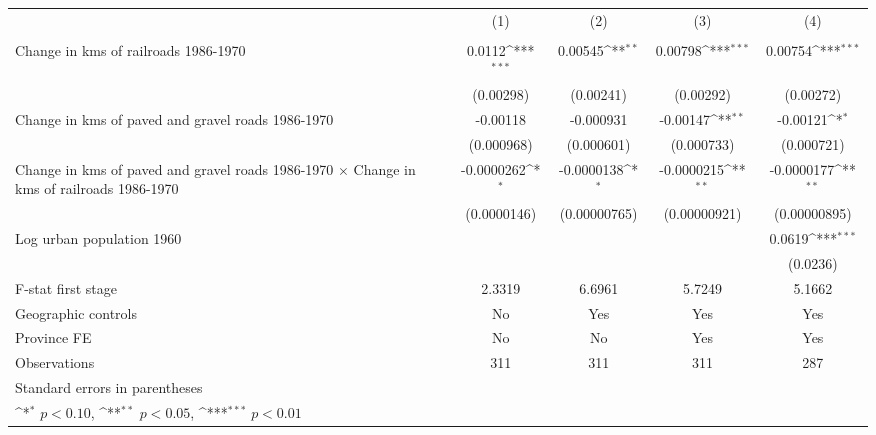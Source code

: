 {
\def\sym#1{\ifmmode^{#1}\else\(^{#1}\)\fi}
\begin{tabular}{l*{4}{c}}
\hline\hline
                &\multicolumn{1}{c}{(1)}&\multicolumn{1}{c}{(2)}&\multicolumn{1}{c}{(3)}&\multicolumn{1}{c}{(4)}\\
                &\multicolumn{1}{c}{}&\multicolumn{1}{c}{}&\multicolumn{1}{c}{}&\multicolumn{1}{c}{}\\
\hline
Change in kms of railroads 1986-1970&   0.0112\sym{***}&  0.00545\sym{**} &  0.00798\sym{***}&  0.00754\sym{***}\\
                &(0.00298)         &(0.00241)         &(0.00292)         &(0.00272)         \\
[1em]
Change in kms of paved and gravel roads 1986-1970& -0.00118         &-0.000931         & -0.00147\sym{**} & -0.00121\sym{*}  \\
                &(0.000968)         &(0.000601)         &(0.000733)         &(0.000721)         \\
[1em]
Change in kms of paved and gravel roads 1986-1970 $\times$ Change in kms of railroads 1986-1970&-0.0000262\sym{*}  &-0.0000138\sym{*}  &-0.0000215\sym{**} &-0.0000177\sym{**} \\
                &(0.0000146)         &(0.00000765)         &(0.00000921)         &(0.00000895)         \\
[1em]
Log urban population 1960&                  &                  &                  &   0.0619\sym{***}\\
                &                  &                  &                  & (0.0236)         \\
\hline
F-stat first stage&   2.3319         &   6.6961         &   5.7249         &   5.1662         \\
Geographic controls&       No         &      Yes         &      Yes         &      Yes         \\
Province FE     &       No         &       No         &      Yes         &      Yes         \\
Observations    &      311         &      311         &      311         &      287         \\
\hline\hline
\multicolumn{5}{l}{\footnotesize Standard errors in parentheses}\\
\multicolumn{5}{l}{\footnotesize \sym{*} \(p<0.10\), \sym{**} \(p<0.05\), \sym{***} \(p<0.01\)}\\
\end{tabular}
}
